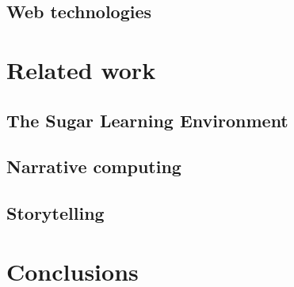 \documentclass{acm_proc_article-sp}
\begin{document}
\subsection{Web technologies}

\section{Related work}
\subsection{The Sugar Learning Environment}
\subsection{Narrative computing}
\subsection{Storytelling}

\section{Conclusions}

%

%
%
\balancecolumns
\end{document}
